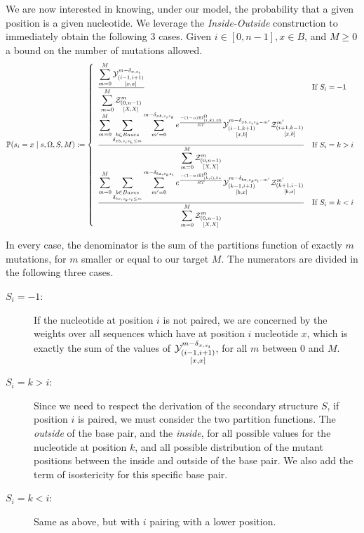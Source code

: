 We are now interested in knowing, under our model, 
 the probability that a given position is a given nucleotide.
We leverage the \emph{Inside-Outside} construction to immediately obtain the following $3$ cases.
Given $i\in[0,n-1],x\in B$, and $M\geq 0$ a bound on the number of mutations allowed. 
$$
	\mathbb{P}(s_i = x\mid s,\Omega, S,M):=\left\{
	\begin{array}{ll}
		\displaystyle
		\frac{
			\displaystyle
			\sum_{m=0}^{M}
			\Y{i-1,i+1}{m-\Kron_{x,s_i}}{x,x}
		}{
			\displaystyle
			\sum_{m=0}^{M}
			\Z{0,n-1}{m}{X,X}
		}
		&\text{If }S_i = -1\\
		\displaystyle
		\frac{
			\displaystyle
			\sum_{m=0}^{M}
			\sum_{\substack{b\in Bases\\\Kron_{xb,s_is_k\leq m}}}
			\sum_{m'=0}^{m-\Kron_{xb,s_is_k}}
     	 e^{\frac{-(1-\alpha)\text{EI}^{\Omega}_{(i,k),xb}}{RT}}
			\Y{i-1,k+1}{m-\Kron_{xb,s_is_k-m'}}{x,b}
			\Z{i+1,k-1}{m'}{x,b}
		}{
			\displaystyle
			\sum_{m=0}^{M}
			\Z{0,n-1}{m}{X,X}
		}
		&\text{If }S_i=k>i\\
		\displaystyle
 		\frac{
			\displaystyle
			\sum_{m=0}^{M}
			\sum_{\substack{b\in Bases\\\Kron_{bx,s_ks_i\leq m}}}
			\sum_{m'=0}^{m-\Kron_{bx,s_ks_i}}
     	 e^{\frac{-(1-\alpha)\text{EI}^{\Omega}_{(k,i),bx}}{RT}}
			\Y{k-1,i+1}{m-\Kron_{bx,s_ks_i-m'}}{b,x}
			\Z{k+1,i-1}{m'}{b,x}
		}{
			\displaystyle
			\sum_{m=0}^{M}
			\Z{0,n-1}{m}{X,X}
		}
		&\text{If }S_i=k<i
	\end{array}\right.
$$

In every case, the denominator is the sum of the partitions function of exactly $m$ mutations, for $m$ smaller or equal to our target $M$. The numerators are divided in the following three cases.
\begin{description}
\item[$S_i=-1$:] If the nucleotide at position $i$ is not paired, we are concerned by the weights
over all sequences which have at position $i$ nucleotide $x$, which is exactly the sum
of the values of $\Y{i-1,i+1}{m-\Kron_{x,s_i}}{x,x}$, for all $m$ between $0$ and $M$.
\item[$S_i=k>i$:] Since we need to respect the derivation of the secondary structure $S$, if 
position $i$ is paired, we must consider the two partition functions. The \emph{outside} of the 
base pair, and the \emph{inside}, for all possible values for the nucleotide at position $k$, and
all possible distribution of the mutant positions between the inside and outside of the base pair. We also add the term of isostericity for this specific base pair.
\item[$S_i=k<i$:] Same as above, but with $i$ pairing with a lower position.
\end{description}